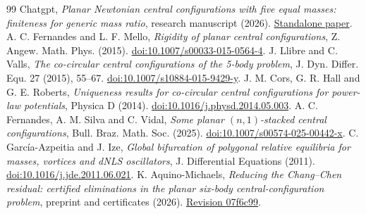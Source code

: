 \documentclass[11pt]{article}
\begin{document}
\begin{thebibliography}{99}
 Chatgpt, \emph{Planar Newtonian central configurations with five equal masses: finiteness for generic mass ratio}, research manuscript (2026). \href{https://github.com/rongyulin/physics-open-problems-AI/blob/main/problems/planar-central-configurations/papers/FiveEqualFiniteness.pdf}{Standalone paper}.
 A. C. Fernandes and L. F. Mello, \emph{Rigidity of planar central configurations}, Z. Angew. Math. Phys. (2015). \href{https://doi.org/10.1007/s00033-015-0564-4}{doi:10.1007/s00033-015-0564-4}.
 J. Llibre and C. Valls, \emph{The co-circular central configurations of the 5-body problem}, J. Dyn. Differ. Equ. 27 (2015), 55--67. \href{https://doi.org/10.1007/s10884-015-9429-y}{doi:10.1007/s10884-015-9429-y}.
 J. M. Cors, G. R. Hall and G. E. Roberts, \emph{Uniqueness results for co-circular central configurations for power-law potentials}, Physica D (2014). \href{https://doi.org/10.1016/j.physd.2014.05.003}{doi:10.1016/j.physd.2014.05.003}.
 A. C. Fernandes, A. M. Silva and C. Vidal, \emph{Some planar $(n,1)$-stacked central configurations}, Bull. Braz. Math. Soc. (2025). \href{https://doi.org/10.1007/s00574-025-00442-x}{doi:10.1007/s00574-025-00442-x}.
 C. Garc\'ia-Azpeitia and J. Ize, \emph{Global bifurcation of polygonal relative equilibria for masses, vortices and dNLS oscillators}, J. Differential Equations (2011). \href{https://doi.org/10.1016/j.jde.2011.06.021}{doi:10.1016/j.jde.2011.06.021}.
 K. Aquino-Michaels, \emph{Reducing the Chang--Chen residual: certified eliminations in the planar six-body central-configuration problem}, preprint and certificates (2026). \href{https://github.com/no-way-labs/smale6-residual/tree/07f6c99}{Revision 07f6c99}.
\end{thebibliography}
\end{document}

